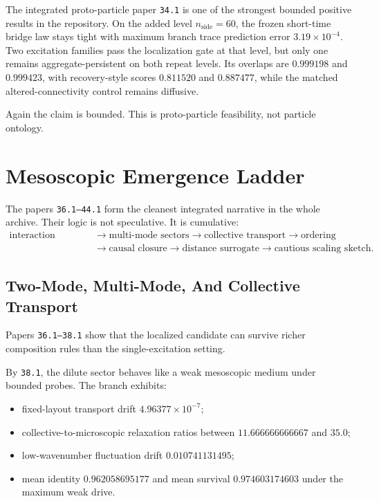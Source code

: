 \documentclass[11pt]{article}
\begin{document}
The integrated proto-particle paper \texttt{34.1} is one of the strongest bounded positive results in the repository. On the added level $n_{\mathrm{side}}=60$, the frozen short-time bridge law stays tight with maximum branch trace prediction error $3.19 \times 10^{-4}$. Two excitation families pass the localization gate at that level, but only one remains aggregate-persistent on both repeat levels. Its overlaps are $0.999198$ and $0.999423$, with recovery-style scores $0.811520$ and $0.887477$, while the matched altered-connectivity control remains diffusive.

Again the claim is bounded. This is proto-particle feasibility, not particle ontology.

\section{Mesoscopic Emergence Ladder}

The papers \texttt{36.1--44.1} form the cleanest integrated narrative in the whole archive. Their logic is not speculative. It is cumulative:
\[
\begin{aligned}
\text{interaction stability}
&\to
\text{multi-mode sectors}
\to
\text{collective transport}
\to
\text{ordering}
\\
&\to
\text{causal closure}
\to
\text{distance surrogate}
\to
\text{cautious scaling sketch}.
\end{aligned}
\]

\subsection{Two-Mode, Multi-Mode, And Collective Transport}

Papers \texttt{36.1--38.1} show that the localized candidate can survive richer composition rules than the single-excitation setting.

By \texttt{38.1}, the dilute sector behaves like a weak mesoscopic medium under bounded probes. The branch exhibits:
\begin{itemize}
\item fixed-layout transport drift $4.96377 \times 10^{-7}$;
\item collective-to-microscopic relaxation ratios between $11.666666666667$ and $35.0$;
\item low-wavenumber fluctuation drift $0.010741131495$;
\item mean identity $0.962058695177$ and mean survival $0.974603174603$ under the maximum weak drive.
\end{itemize}
\end{document}
